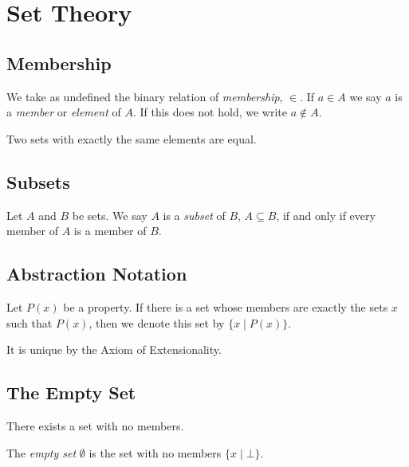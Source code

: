 \chapter{Set Theory}

\section{Membership}

We take as undefined the binary relation of \emph{membership}, $\in$. If $a \in A$ we say $a$ is a \emph{member} or \emph{element} of $A$.
If this does not hold, we write $a \notin A$.

\begin{axiom}
    Two sets with exactly the same elements are equal.
\end{axiom}

\section{Subsets}

\begin{definition}[Subset]
    Let $A$ and $B$ be sets. We say $A$ is a \emph{subset} of $B$, $A \subseteq B$, if and only if every member of $A$ is a member of $B$.    
\end{definition}

\section{Abstraction Notation}

\begin{definitions}[Extensionality]
    Let $P(x)$ be a property. If there is a set whose members are exactly the sets $x$ such that $P(x)$, then we denote this set by $\{ x \mid P(x) \}$.

    It is unique by the Axiom of Extensionality.
\end{definitions}

\section{The Empty Set}

\begin{axiom}
    There exists a set with no members.
\end{axiom}

\begin{definition}
    The \emph{empty set} $\emptyset$ is the set with no members $\{ x \mid \bot \}$.
\end{definition}

